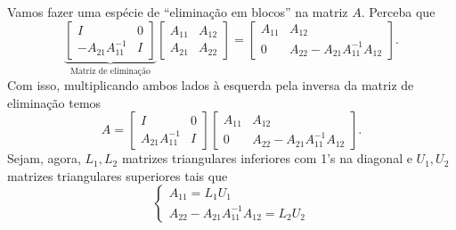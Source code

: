 \documentclass[leqno]{article}
\numberwithin{equation}{section}
\begin{document}
        \begin{sol} 
            Vamos fazer uma espécie de ``eliminação em blocos'' na matriz \( A \).
            Perceba que
            \begin{equation*}
                \underbrace{
                    \begin{bmatrix}
                        I & 0 \\
                        - A_{ 21 } A_{ 11 }^{ -1 } & I
                    \end{bmatrix}
                }_{ \text{Matriz de eliminação} }
                \begin{bmatrix}
                    A_{ 11 } & A_{ 12 } \\
                    A_{ 21 } & A_{ 22 }
                \end{bmatrix}
                =
                \begin{bmatrix}
                    A_{ 11 } & A_{ 12 } \\
                    0 & A_{ 22 } - A_{ 21 } A_{ 11 }^{ -1 } A_{ 12 }
                \end{bmatrix}
            .\end{equation*}
            Com isso, multiplicando ambos lados à esquerda pela inversa da matriz de eliminação temos
            \begin{equation*}
                A =
                \begin{bmatrix}
                    I & 0 \\
                    A_{ 21 } A_{ 11 }^{ -1 } & I
                \end{bmatrix}
                \begin{bmatrix}
                    A_{ 11 } & A_{ 12 } \\
                    0 & A_{ 22 } - A_{ 21 } A_{ 11 }^{ -1 } A_{ 12 }
                \end{bmatrix}
            .\end{equation*}
            Sejam, agora, \( L_{ 1 }, L_{ 2 } \) matrizes triangulares inferiores com 1's na diagonal e \( U_{ 1 }, U_{ 2 } \) matrizes triangulares superiores tais que
            \begin{equation*}
                \begin{cases}
                    A_{ 11 } = L_{ 1 } U_{ 1 } \\
                    A_{ 22 } - A_{ 21 } A_{ 11 }^{ -1 } A_{ 12 } = L_{ 2 } U_{ 2 }
                \end{cases}

\end{equation*}
\end{sol}
\end{document}
